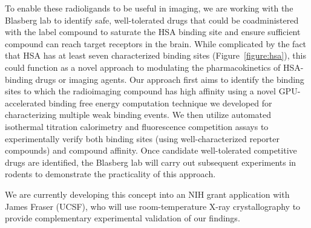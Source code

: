 \documentclass[10pt]{article}
\renewcommand{\baselinestretch}{1.1}
\begin{document}
To enable these radioligands to be useful in imaging, we are working with the Blasberg lab to identify safe, well-tolerated drugs that could be coadministered with the label compound to saturate the HSA binding site and ensure sufficient compound can reach target receptors in the brain.
While complicated by the fact that HSA has at least seven characterized binding sites (Figure~\ref{figure:hsa}), this could function as a novel approach to modulating the pharmacokinetics of HSA-binding drugs or imaging agents.
Our approach first aims to identify the binding sites to which the radioimaging compound has high affinity using a novel GPU-accelerated binding free energy computation technique we developed for characterizing multiple weak binding events.
We then utilize automated isothermal titration calorimetry and fluorescence competition assays to experimentally verify both binding sites (using well-characterized reporter compounds) and compound affinity.
Once candidate well-tolerated competitive drugs are identified, the Blasberg lab will carry out subsequent experiments in rodents to demonstrate the practicality of this approach.

We are currently developing this concept into an NIH grant application with James Fraser (UCSF), who will use room-temperature X-ray crystallography to provide complementary experimental validation of our findings.


\eject
\footnotesize
\setlength{\parskip}{0em}
\renewcommand{\baselinestretch}{1.0}
 

\end{document}
